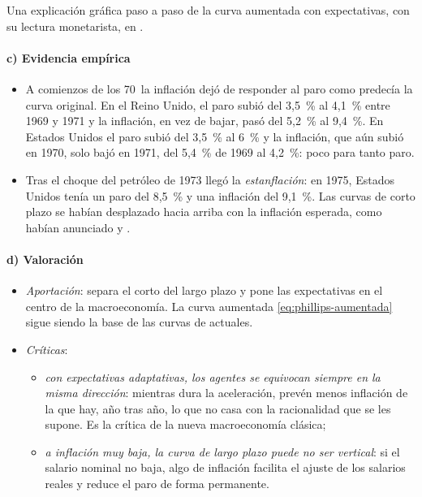 \documentclass[11pt]{article}
\begin{document}
\begin{anotaciones}
Una explicación gráfica paso a paso de la curva aumentada con expectativas, con su lectura monetarista, en \textcite{Policonomics2026Phillips}.
\end{anotaciones}

\paragraph{c) Evidencia empírica}

\begin{itemize}
\item A comienzos de los 70~la inflación dejó de responder al paro como predecía la curva original. En el Reino Unido, el paro subió del 3,5~\% al 4,1~\% entre 1969 y 1971 y la inflación, en vez de bajar, pasó del 5,2~\% al 9,4~\%\nocite{BoE2017Millennium}. En Estados Unidos el paro subió del 3,5~\% al 6~\%\nocite{BLS2026UNRATE} y la inflación, que aún subió en 1970, solo bajó en 1971, del 5,4~\% de 1969 al 4,2~\%\nocite{BLS2026CPI}: poco para tanto paro.
\item Tras el choque del petróleo de 1973 llegó la \emph{estanflación}: en 1975, Estados Unidos tenía un paro del 8,5~\% y una inflación del 9,1~\%\nocite{BLS2026UNRATE,BLS2026CPI}. Las curvas de corto plazo se habían desplazado hacia arriba con la inflación esperada, como habían anunciado  y .
\end{itemize}

\paragraph{d) Valoración}

\begin{itemize}
\item \emph{Aportación}: separa el corto del largo plazo y pone las expectativas en el centro de la macroeconomía. La curva aumentada \eqref{eq:phillips-aumentada} sigue siendo la base de las curvas de  actuales.
\item \emph{Críticas}:
  \begin{itemize}
  \item \emph{con expectativas adaptativas, los agentes se equivocan siempre en la misma dirección}: mientras dura la aceleración, prevén menos inflación de la que hay, año tras año, lo que no casa con la racionalidad que se les supone. Es la crítica de la nueva macroeconomía clásica;
  \item \emph{a inflación muy baja, la curva de largo plazo puede no ser vertical}: si el salario nominal no baja, algo de inflación facilita el ajuste de los salarios reales y reduce el paro de forma permanente\nocite{AkerlofDickensPerry1996}.
  \end{itemize}
\end{itemize}
\end{document}
